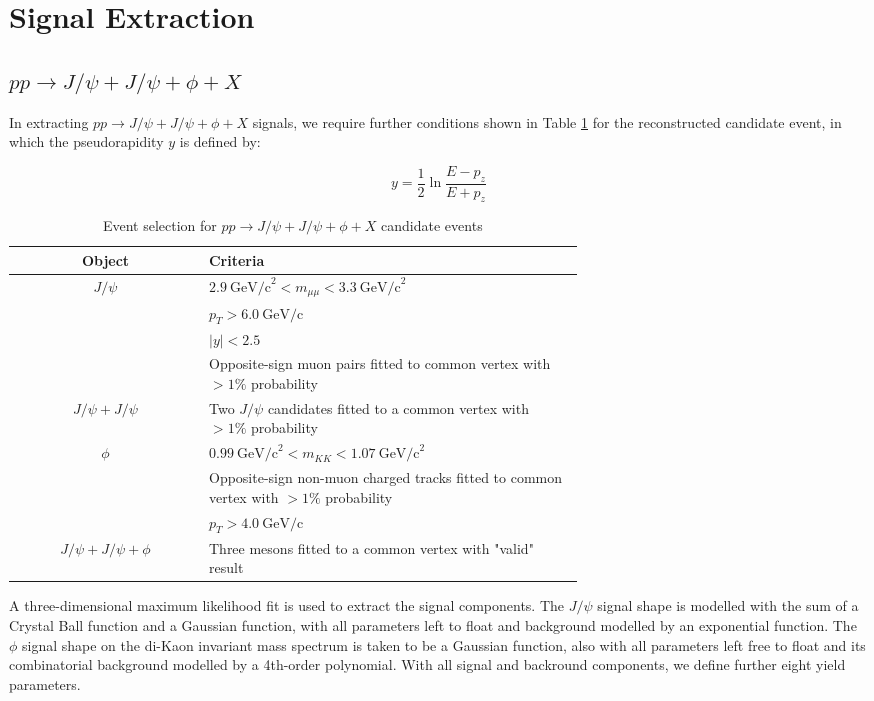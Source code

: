 \documentclass[10pt,twocolumn]{article}
\newcommand*{\GeVc}{~\text{GeV/c}}
\newcommand*{\GeVcs}{~\text{GeV/c}^2}
\begin{document}
\section{Signal Extraction}

\subsection{$pp\to J/\psi+J/\psi+\phi+X$}

In extracting $pp\to J/\psi+J/\psi+\phi+X$ signals, we require further conditions shown in Table \ref{tab:cut_JpsiJpsiPhi} for the reconstructed candidate event, in which the pseudorapidity $y$ is defined by:

\begin{equation}
    y = \frac{1}{2} \ln \frac {E-p_z}{E+p_z}
\end{equation}

\begin{table}[]
    \centering
    \caption{Event selection for $pp\to J/\psi+J/\psi+\phi+X$ candidate events\\}
    \begin{tabular}{c p{0.66\linewidth}}
        \toprule
        Object & Criteria \\
        \midrule
        $J/\psi$ & $2.9 \GeVcs < m_{\mu\mu} < 3.3 \GeVcs$ \\
                 & $p_T > 6.0\GeVc$ \\
                 & $|y| < 2.5$ \\
                 & Opposite-sign muon pairs fitted to common vertex with $> 1\%$ probability \\
                 \midrule
        $J/\psi+J/\psi$ & Two $J/\psi$ candidates fitted to a common vertex with $> 1\%$ probability \\
        \midrule
        $\phi$ & $0.99 \GeVcs < m_{KK} < 1.07 \GeVcs$ \\
               & Opposite-sign non-muon charged tracks fitted to common vertex with $> 1\%$ probability \\
               & $p_T > 4.0\GeVc$ \\
               \midrule
        $J/\psi+J/\psi+\phi$ & Three mesons fitted to a common vertex with "valid" result \\
        \bottomrule
    \end{tabular}
    \label{tab:cut_JpsiJpsiPhi}
\end{table}

A three-dimensional maximum likelihood fit is used to extract the signal components. The $J/\psi$ signal shape is modelled with the sum of a Crystal Ball function and a Gaussian function, with all parameters left to float and background modelled by an exponential function. The $\phi$ signal shape on the di-Kaon invariant mass spectrum is taken to be a Gaussian function, also with all parameters left free to float and its combinatorial background modelled by a 4th-order polynomial. With all signal and backround components, we define further eight yield parameters.
\end{document}
